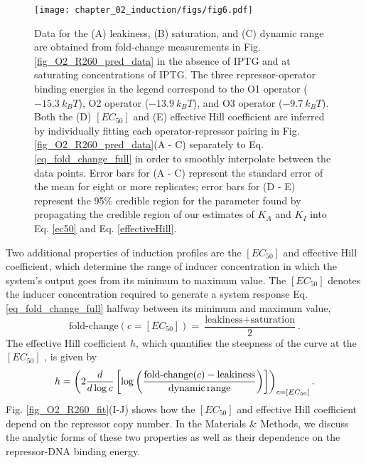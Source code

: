 \begin{figure}[h!]
	\centering \texttt{[image: chapter\_02\_induction/figs/fig6.pdf]}
	\caption[Predictions and experimental measurements of key properties of
		induction profiles.]{Data for the (A) leakiness, (B)
	saturation, and (C) dynamic range are obtained from fold-change
	measurements in Fig. \ref{fig_O2_R260_pred_data} in the absence of IPTG and at
	saturating concentrations of IPTG. The three repressor-operator binding
	energies in the legend correspond to the O1 operator ($-15.3~k_B T$), O2
	operator ($-13.9~k_B T$), and O3 operator ($-9.7~k_B T$). Both the
	(D) $[EC_{50}]$ and (E) effective Hill coefficient are
	inferred by individually fitting each operator-repressor pairing in
	Fig. \ref{fig_O2_R260_pred_data}(A - C) separately to
	Eq. \ref{eq_fold_change_full} in order to smoothly interpolate between the data
	points. Error bars for (A - C) represent the standard error of
	the mean for eight or more replicates; error bars for (D - E) 
	represent the 95\% credible region for the parameter found by propagating the
	credible region of our estimates of $K_A$ and $K_I$ into
	Eq. \ref{ec50} and Eq. \ref{effectiveHill}.} \label{fig_properties_data}
\end{figure}

Two additional properties of induction profiles are the $[EC_{50}]$ and
effective Hill coefficient, which determine the range of inducer concentration
in which the system's output goes from its minimum to maximum value. The
$[EC_{50}]$ denotes the inducer concentration required to generate a system
response Eq. \ref{eq_fold_change_full} halfway between its minimum and maximum
value,
\begin{equation} \label{ec50}
\text{fold-change}(c = [EC_{50}]) = \frac{\text{leakiness} + \text{saturation}}{2}.
\end{equation}
The effective Hill coefficient $h$, which quantifies the steepness of the
curve at the $[EC_{50}]$ \cite{Marzen2013}, is given by
\begin{equation} \label{effectiveHill}
h = \left( 2 \frac{d}{d \log c} \left[ \log \left( \frac{ \text{fold-change}(c) - \text{leakiness}}{\text{dynamic\,range}} \right) \right] \right)_{c = [EC_{50}]}.
\end{equation}
Fig. \ref{fig_O2_R260_fit}(I-J) shows how the $[EC_{50}]$ and
effective Hill coefficient depend on the repressor copy number. In
the Materials \& Methods, we discuss
the analytic forms of these two properties as well as their dependence on the
repressor-DNA binding energy.

